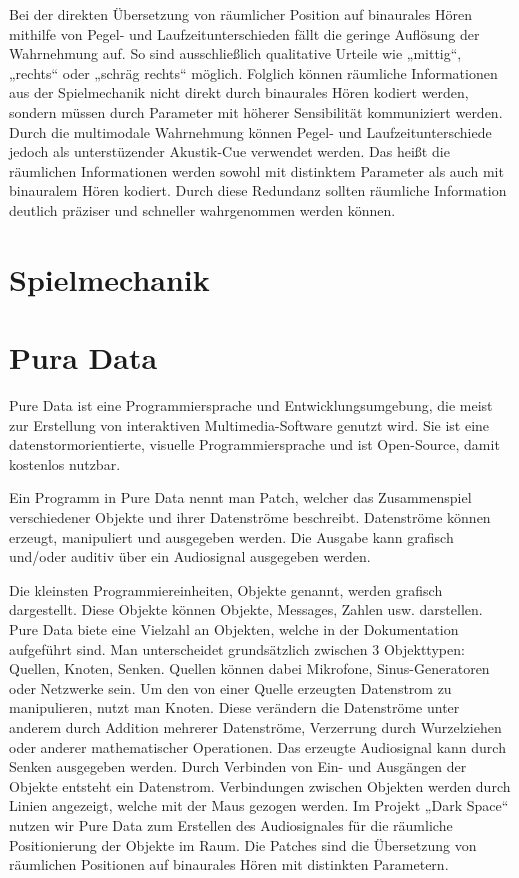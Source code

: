 \documentclass[a4paper, 11pt]{scrartcl}
\begin{document}
Bei der direkten Übersetzung von räumlicher Position auf binaurales Hören
mithilfe von Pegel- und Laufzeitunterschieden fällt die geringe Auflösung der
Wahrnehmung auf. So sind ausschließlich qualitative Urteile wie „mittig“,
„rechts“ oder „schräg rechts“ möglich. Folglich können räumliche Informationen
aus der Spielmechanik nicht direkt durch binaurales Hören kodiert werden,
sondern müssen durch Parameter mit höherer Sensibilität kommuniziert werden.
Durch die multimodale Wahrnehmung können Pegel- und Laufzeitunterschiede jedoch
als unterstüzender Akustik-Cue verwendet werden. Das heißt die räumlichen
Informationen werden sowohl mit distinktem Parameter als auch mit binauralem
Hören kodiert. Durch diese Redundanz sollten räumliche Information deutlich
präziser und schneller wahrgenommen werden können.

\section{Spielmechanik}
\label{sec:spielmechanik}

\section{Pura Data}
\label{sec:Pure Data}

Pure Data ist eine Programmiersprache und Entwicklungsumgebung, die meist zur Erstellung von interaktiven Multimedia-Software genutzt wird. Sie ist eine datenstormorientierte, visuelle Programmiersprache und ist Open-Source, damit kostenlos nutzbar.

Ein Programm in Pure Data nennt man Patch, welcher das Zusammenspiel verschiedener Objekte und ihrer Datenströme beschreibt. Datenströme können erzeugt, manipuliert und ausgegeben werden. Die Ausgabe kann grafisch und/oder auditiv über ein Audiosignal ausgegeben werden.  

Die kleinsten Programmiereinheiten, Objekte genannt, werden grafisch dargestellt. Diese Objekte können Objekte, Messages, Zahlen usw. darstellen. Pure Data biete eine Vielzahl an Objekten, welche in der Dokumentation aufgeführt sind. Man unterscheidet grundsätzlich zwischen 3 Objekttypen: Quellen, Knoten, Senken. Quellen können dabei Mikrofone, Sinus-Generatoren oder Netzwerke sein. Um den von einer Quelle erzeugten Datenstrom zu manipulieren, nutzt man Knoten. Diese verändern die Datenströme unter anderem durch Addition mehrerer Datenströme, Verzerrung durch Wurzelziehen oder anderer mathematischer Operationen. Das erzeugte Audiosignal kann durch Senken ausgegeben werden. Durch Verbinden von Ein- und Ausgängen der Objekte entsteht ein Datenstrom. Verbindungen zwischen Objekten werden durch Linien angezeigt, welche mit der Maus gezogen werden. 
Im Projekt „Dark Space“ nutzen wir Pure Data zum Erstellen des Audiosignales für die räumliche Positionierung der Objekte im Raum. Die Patches sind die Übersetzung von räumlichen Positionen auf binaurales Hören mit distinkten Parametern. 
\end{document}
